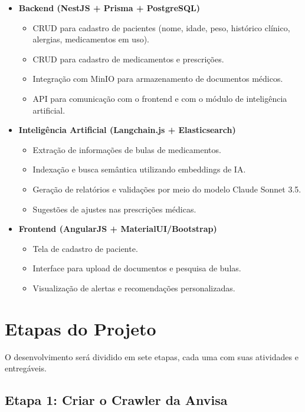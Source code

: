 \begin{itemize}
    \item \textbf{Backend (NestJS + Prisma + PostgreSQL)}
    \begin{itemize}
        \item CRUD para cadastro de pacientes (nome, idade, peso, histórico clínico, alergias, medicamentos em uso).
        \item CRUD para cadastro de medicamentos e prescrições.
        \item Integração com MinIO para armazenamento de documentos médicos.
        \item API para comunicação com o frontend e com o módulo de inteligência artificial.
    \end{itemize}

    \item \textbf{Inteligência Artificial (Langchain.js + Elasticsearch)}
    \begin{itemize}
        \item Extração de informações de bulas de medicamentos.
        \item Indexação e busca semântica utilizando embeddings de IA.
        \item Geração de relatórios e validações por meio do modelo Claude Sonnet 3.5.
        \item Sugestões de ajustes nas prescrições médicas.
    \end{itemize}

    \item \textbf{Frontend (AngularJS + MaterialUI/Bootstrap)}
    \begin{itemize}
        \item Tela de cadastro de paciente.
        \item Interface para upload de documentos e pesquisa de bulas.
        \item Visualização de alertas e recomendações personalizadas.
    \end{itemize}
\end{itemize}

\section{Etapas do Projeto}

O desenvolvimento será dividido em sete etapas, cada uma com suas atividades e entregáveis.

\subsection{Etapa 1: Criar o Crawler da Anvisa}

